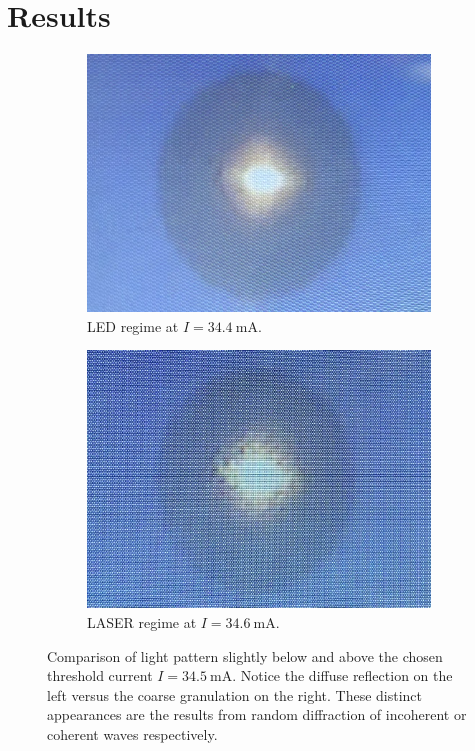 \section{Results}
\label{sec:results}

\begin{figure}
    \begin{subfigure}{0.48\textwidth}
        \centering
        \includegraphics[width=\linewidth]{content/measurement/led.jpg}
        \caption{LED regime at $I = \qty{34.4}{\milli\ampere}$.}
        \label{fig:pattern_led}
    \end{subfigure}
    \hfill
    \begin{subfigure}{0.48\textwidth}
        \centering
        \includegraphics[width=\linewidth]{content/measurement/laser.jpg}
        \caption{LASER regime at $I = \qty{34.6}{\milli\ampere}$.}
        \label{fig:pattern_laser}
    \end{subfigure}
    \caption{Comparison of light pattern slightly below and above the chosen threshold current $I = \qty{34.5}{\milli\ampere}$.
             Notice the diffuse reflection on the left versus the coarse granulation on the right. These distinct appearances
             are the results from random diffraction of incoherent or coherent waves respectively.}
    \label{fig:pattern}
\end{figure}

